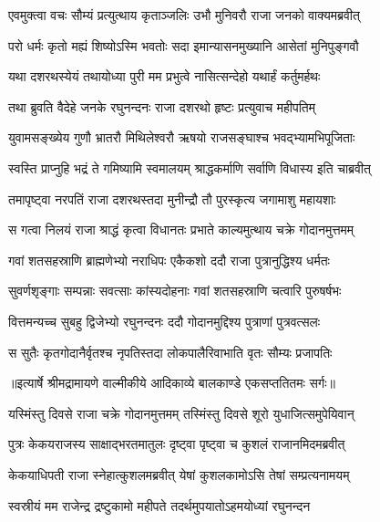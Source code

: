 \twolineshloka
{एवमुक्त्वा वचः सौम्यं प्रत्युत्थाय कृताञ्जलिः}
{उभौ मुनिवरौ राजा जनको वाक्यमब्रवीत्} %

\twolineshloka
{परो धर्मः कृतो मह्यं शिष्योऽस्मि भवतोः सदा}
{इमान्यासनमुख्यानि आसेतां मुनिपुङ्गवौ} %

\twolineshloka
{यथा दशरथस्येयं तथायोध्या पुरी मम}
{प्रभुत्वे नासित्सन्देहो यथार्हं कर्तुमर्हथः} %

\twolineshloka
{तथा ब्रुवति वैदेहे जनके रघुनन्दनः}
{राजा दशरथो हृष्टः प्रत्युवाच महीपतिम्} %

\twolineshloka
{युवामसङ्ख्येय गुणौ भ्रातरौ मिथिलेश्वरौ}
{ऋषयो राजसङ्घाश्च भवद्भ्यामभिपूजिताः} %

\twolineshloka
{स्वस्ति प्राप्नुहि भद्रं ते गमिष्यामि स्वमालयम्}
{श्राद्धकर्माणि सर्वाणि विधास्य इति चाब्रवीत्} %

\twolineshloka
{तमापृष्ट्वा नरपतिं राजा दशरथस्तदा}
{मुनीन्द्रौ तौ पुरस्कृत्य जगामाशु महायशाः} %

\twolineshloka
{स गत्वा निलयं राजा श्राद्धं कृत्वा विधानतः}
{प्रभाते काल्यमुत्थाय चक्रे गोदानमुत्तमम्} %

\twolineshloka
{गवां शतसहस्राणि ब्राह्मणेभ्यो नराधिपः}
{एकैकशो ददौ राजा पुत्रानुद्धिश्य धर्मतः} %

\twolineshloka
{सुवर्णशृङ्गाः सम्पन्नाः सवत्साः कांस्यदोहनाः}
{गवां शतसहस्राणि चत्वारि पुरुषर्षभः} %

\twolineshloka
{वित्तमन्यच्च सुबहु द्विजेभ्यो रघुनन्दनः}
{ददौ गोदानमुद्दिश्य पुत्राणां पुत्रवत्सलः} %

\twolineshloka
{स सुतैः कृतगोदानैर्वृतश्च नृपतिस्तदा}
{लोकपालैरिवाभाति वृतः सौम्यः प्रजापतिः} %


{॥इत्यार्षे श्रीमद्रामायणे वाल्मीकीये आदिकाव्ये बालकाण्डे एकसप्ततितमः सर्गः॥}


\twolineshloka
{यस्मिंस्तु दिवसे राजा चक्रे गोदानमुत्तमम्}
{तस्मिंस्तु दिवसे शूरो युधाजित्समुपेयिवान्} %

\twolineshloka
{पुत्रः केकयराजस्य साक्षाद्भरतमातुलः}
{दृष्ट्वा पृष्ट्वा च कुशलं राजानमिदमब्रवीत्} %

\twolineshloka
{केकयाधिपती राजा स्नेहात्कुशलमब्रवीत्}
{येषां कुशलकामोऽसि तेषां सम्प्रत्यनामयम्} %

\twolineshloka
{स्वस्रीयं मम राजेन्द्र द्रष्टुकामो महीपते}
{तदर्थमुपयातोऽहमयोध्यां रघुनन्दन} %

